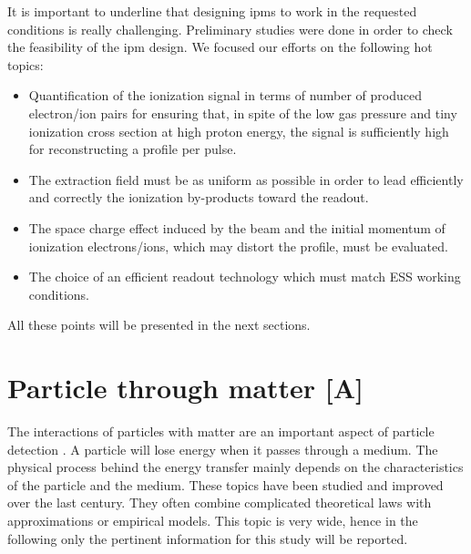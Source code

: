 \begin{refsection}
  It is important to underline that designing \acrshort{ipm}s to work in the requested conditions is really challenging. Preliminary studies were done in order to check the feasibility of the \acrshort{ipm} design. We focused our efforts on the following hot topics:
  \begin{itemize}
    \item Quantification of the ionization signal in terms of number of produced electron/ion pairs for ensuring that, in spite of the low gas pressure and tiny ionization cross section at high proton energy, the signal is sufficiently high for reconstructing a profile per pulse.
    \item The extraction field must be as uniform as possible in order to lead efficiently and correctly the ionization by-products toward the readout. %
    \item The space charge effect induced by the beam and the initial momentum of ionization electrons/ions, which may distort the profile, must be evaluated.
    \item The choice of an efficient readout technology which must match ESS working conditions.
  \end{itemize}
  All these points will be presented in the next sections.


  \section{Particle through matter [A]}
  \label{chap3:sec_particle_in_matter}
  The interactions of particles with matter are an important aspect of particle detection \cite{Knoll2010,Leo1994}. A particle will lose energy when it passes through a medium. The physical process behind the energy transfer mainly depends on the characteristics of the particle and the medium. These topics have been studied and improved over the last century. They often combine complicated theoretical laws with approximations or empirical models. This topic is very wide, hence in the following only the pertinent information for this study will be reported.


\end{refsection}
